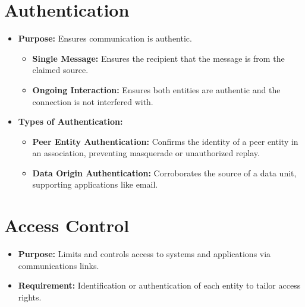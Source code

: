\section{Authentication}
\begin{itemize}
    \item \textbf{Purpose:} Ensures communication is authentic.
    \begin{itemize}
        \item \textbf{Single Message:} Ensures the recipient that the message is from the claimed source.
        \item \textbf{Ongoing Interaction:} Ensures both entities are authentic and the connection is not interfered with.
    \end{itemize}
    \item \textbf{Types of Authentication:}
    \begin{itemize}
        \item \textbf{Peer Entity Authentication:} Confirms the identity of a peer entity in an association, preventing masquerade or unauthorized replay.
        \item \textbf{Data Origin Authentication:} Corroborates the source of a data unit, supporting applications like email.
    \end{itemize}
\end{itemize}

\section{Access Control}
\begin{itemize}
    \item \textbf{Purpose:} Limits and controls access to systems and applications via communications links.
    \item \textbf{Requirement:} Identification or authentication of each entity to tailor access rights.
\end{itemize}

